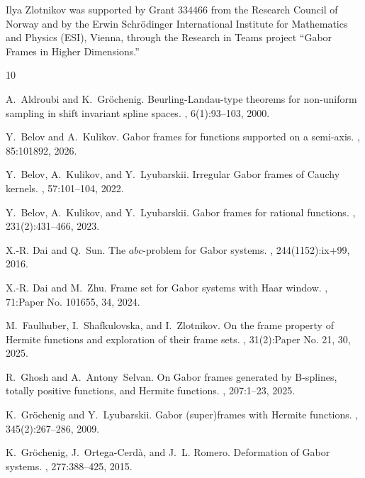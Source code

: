 \documentclass[12pt]{amsart}
\numberwithin{equation}{section}
\begin{document}
Ilya Zlotnikov was supported by Grant 334466 from the Research Council of Norway and by the Erwin Schrödinger International Institute for Mathematics and Physics (ESI), Vienna, through the Research in Teams project “Gabor Frames in Higher Dimensions.”


\begin{thebibliography}{10}

A.~Aldroubi and K.~Gr\"ochenig.
\newblock Beurling-{L}andau-type theorems for non-uniform sampling in shift invariant spline spaces.
, 6(1):93--103, 2000.

Y.~Belov and A.~Kulikov.
\newblock Gabor frames for functions supported on a semi-axis.
, 85:101892, 2026.

Y.~Belov, A.~Kulikov, and Y.~Lyubarskii.
\newblock Irregular {G}abor frames of {C}auchy kernels.
, 57:101--104, 2022.

Y.~Belov, A.~Kulikov, and Y.~Lyubarskii.
\newblock Gabor frames for rational functions.
, 231(2):431--466, 2023.

X.-R. Dai and Q.~Sun.
\newblock The {${abc}$}-problem for {G}abor systems.
, 244(1152):ix+99, 2016.

X.-R. Dai and M.~Zhu.
\newblock Frame set for {G}abor systems with {H}aar window.
, 71:Paper No. 101655, 34, 2024.

M.~Faulhuber, I.~Shafkulovska, and I.~Zlotnikov.
\newblock On the frame property of {H}ermite functions and exploration of their frame sets.
, 31(2):Paper No. 21, 30, 2025.

R.~Ghosh and A.~Antony~Selvan.
\newblock On {G}abor frames generated by {B}-splines, totally positive functions, and {H}ermite functions.
, 207:1--23, 2025.

K.~Gr\"{o}chenig and Y.~Lyubarskii.
\newblock Gabor (super)frames with {H}ermite functions.
, 345(2):267--286, 2009.

K.~Gr\"{o}chenig, J.~Ortega-Cerd\`a, and J.~L. Romero.
\newblock Deformation of {G}abor systems.
, 277:388--425, 2015.


\end{thebibliography}
\end{document}
